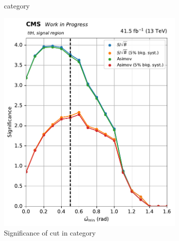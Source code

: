 \begin{figure}[htbp]
\begin{subfigure}[b]{0.27\textwidth}
        \caption{\ggH category}
    \end{subfigure}

    \begin{subfigure}[b]{0.27\textwidth}
        \includegraphics[width=\textwidth]{figures/category_optimisations/significance_ttH_min_omega_tilde_all.pdf}
        \caption{Significance of cut in \ttH category}
    \end{subfigure}
    \hfill
    \begin{subfigure}[b]{0.27\textwidth}

\end{subfigure}
\end{figure}
